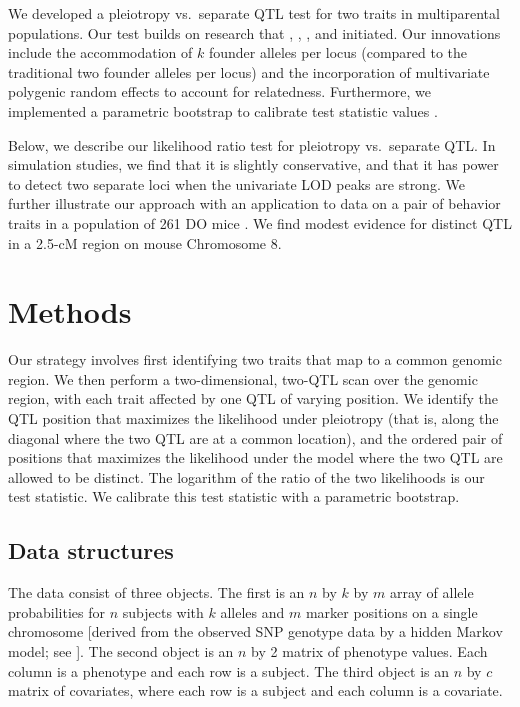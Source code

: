 \documentclass[12pt,twoside, lineno]{gsajnl}
\begin{document}
We developed a pleiotropy vs.\ separate QTL test for two traits in
multiparental populations. Our test builds on research that
\citet{jiang1995multiple}, \citet{knott2000multitrait},
\citet{tian2016dissection}, and \citet{zhou2014efficient} initiated.
Our innovations include the accommodation of $k$ founder alleles per
locus (compared to the traditional two founder alleles per locus) and
the incorporation of multivariate polygenic random effects to account
for relatedness. Furthermore, we implemented a parametric bootstrap to
calibrate test statistic values \citep{efron1979,tian2016dissection}.

Below, we describe our likelihood ratio test for pleiotropy vs.\
separate QTL. In simulation studies, we find that it is slightly
conservative, and that it has power to detect two separate loci when
the univariate LOD peaks are strong. We further illustrate our
approach with an application to data on a pair of behavior traits in
a population of 261 DO mice \citep{logan2013high,recla2014precise}.
We find modest evidence for distinct QTL in a 2.5-cM region on mouse
Chromosome 8.


\section{Methods}
\label{sec:materials:methods}

Our strategy involves first identifying two traits that map to a common
genomic region. We then perform a two-dimensional, two-QTL scan over
the genomic region, with each trait affected by one QTL of varying
position. We identify the QTL position that maximizes the likelihood
under pleiotropy (that is, along the diagonal where the two QTL are at
a common location), and the ordered pair of positions that maximizes
the likelihood under the model where the two QTL are allowed to be
distinct. The logarithm of the ratio of the two likelihoods is our
test statistic. We calibrate this test statistic with a parametric
bootstrap.

\subsection{Data structures}

The data consist of three objects. The first is an $n$ by $k$ by $m$
array of allele probabilities for $n$ subjects with $k$ alleles and
$m$ marker positions on a single chromosome [derived from the observed
SNP genotype data by a hidden Markov model; see
\citet{broman2019rqtl2}]. The second object is an $n$ by 2 matrix of
phenotype values. Each column is a phenotype and each row is a
subject. The third object is an $n$ by $c$ matrix of covariates, where
each row is a subject and each column is a covariate.
\end{document}
